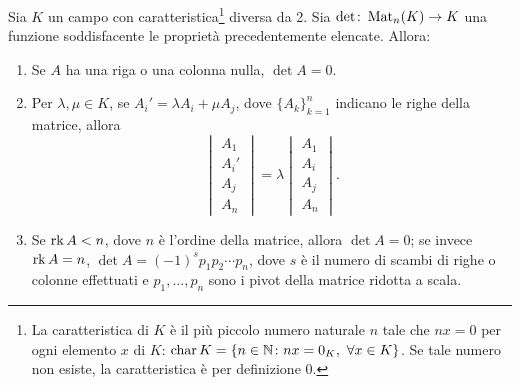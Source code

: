 \begin{proprieta}
	Sia $K$ un campo con caratteristica\footnote{La caratteristica di $K$ è il più piccolo numero naturale $n$ tale che $nx=0$ per ogni elemento $x$ di $K$: $\operatorname{char} K=\{n\in\mathbb{N}\colon nx=0_K,\ \forall x\in K\}$. Se tale numero non esiste, la caratteristica è per definizione 0.} diversa da 2.
	Sia $\det\colon\operatorname{Mat}_n(K)\to K$ una funzione soddisfacente le proprietà precedentemente elencate.
	Allora:
	\begin{enumerate}
		\item Se $A$ ha una riga o una colonna nulla, $\det A=0$.
		\item Per $\lambda,\mu\in K$, se $A_i'=\lambda A_i+\mu A_j$, dove $\{A_k\}_{k=1}^n$ indicano le righe della matrice, allora
		\begin{equation*}
			\begin{vmatrix}
				A_1\\A_i'\\A_j\\A_n
			\end{vmatrix}
			=\lambda
			\begin{vmatrix}
				A_1\\A_i\\A_j\\A_n
			\end{vmatrix}.
		\end{equation*}
		\item Se $\operatorname{rk} A<n$, dove $n$ è l'ordine della matrice, allora $\det A=0$; se invece $\operatorname{rk} A=n$, $\det A=(-1)^sp_1p_2\cdots p_n$, dove $s$ è il numero di scambi di righe o colonne effettuati e $p_1,\dots,p_n$ sono i pivot della matrice ridotta a scala.
	\end{enumerate}
\end{proprieta}
